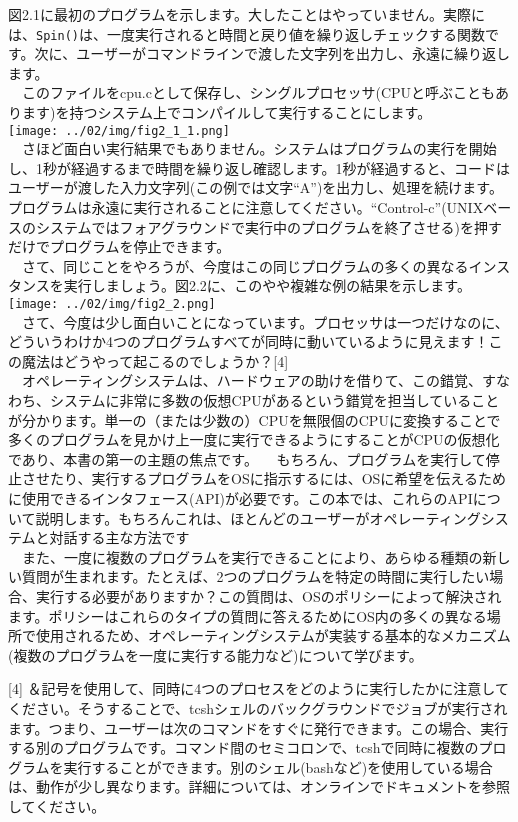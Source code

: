 図2.1に最初のプログラムを示します。大したことはやっていません。実際には、\texttt{Spin()}は、一度実行されると時間と戻り値を繰り返しチェックする関数です。次に、ユーザーがコマンドラインで渡した文字列を出力し、永遠に繰り返します。\\
　このファイルをcpu.cとして保存し、シングルプロセッサ(CPUと呼ぶこともあります)を持つシステム上でコンパイルして実行することにします。\\
\texttt{[image: ../02/img/fig2\_1\_1.png]}\\
　さほど面白い実行結果でもありません。システムはプログラムの実行を開始し、1秒が経過するまで時間を繰り返し確認します。1秒が経過すると、コードはユーザーが渡した入力文字列(この例では文字``A'')を出力し、処理を続けます。プログラムは永遠に実行されることに注意してください。``Control-c''(UNIXベースのシステムではフォアグラウンドで実行中のプログラムを終了させる)を押すだけでプログラムを停止できます。\\
　さて、同じことをやろうが、今度はこの同じプログラムの多くの異なるインスタンスを実行しましょう。図2.2に、このやや複雑な例の結果を示します。\\
\texttt{[image: ../02/img/fig2\_2.png]}\\
　さて、今度は少し面白いことになっています。プロセッサは一つだけなのに、どういうわけか4つのプログラムすべてが同時に動いているように見えます！この魔法はどうやって起こるのでしょうか？{[}4{]}\\
　オペレーティングシステムは、ハードウェアの助けを借りて、この錯覚、すなわち、システムに非常に多数の仮想CPUがあるという錯覚を担当していることが分かります。単一の（または少数の）CPUを無限個のCPUに変換することで多くのプログラムを見かけ上一度に実行できるようにすることがCPUの仮想化であり、本書の第一の主題の焦点です。
　もちろん、プログラムを実行して停止させたり、実行するプログラムをOSに指示するには、OSに希望を伝えるために使用できるインタフェース(API)が必要です。この本では、これらのAPIについて説明します。もちろんこれは、ほとんどのユーザーがオペレーティングシステムと対話する主な方法です\\
　また、一度に複数のプログラムを実行できることにより、あらゆる種類の新しい質問が生まれます。たとえば、2つのプログラムを特定の時間に実行したい場合、実行する必要がありますか？この質問は、OSのポリシーによって解決されます。ポリシーはこれらのタイプの質問に答えるためにOS内の多くの異なる場所で使用されるため、オペレーティングシステムが実装する基本的なメカニズム(複数のプログラムを一度に実行する能力など)について学びます。

{[}4{]}
＆記号を使用して、同時に4つのプロセスをどのように実行したかに注意してください。そうすることで、tcshシェルのバックグラウンドでジョブが実行されます。つまり、ユーザーは次のコマンドをすぐに発行できます。この場合、実行する別のプログラムです。コマンド間のセミコロンで、tcshで同時に複数のプログラムを実行することができます。別のシェル(bashなど)を使用している場合は、動作が少し異なります。詳細については、オンラインでドキュメントを参照してください。

